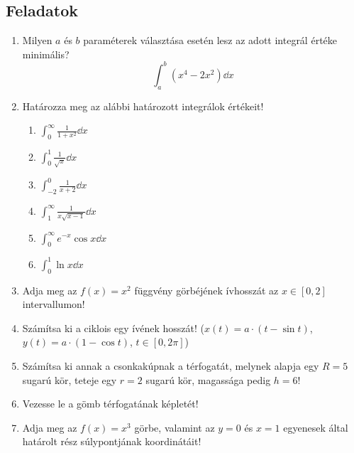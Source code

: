 \documentclass[a4paper, 12pt]{scrartcl}
\begin{document}
\clearpage
\subsection{Feladatok}

\begin{enumerate}
  \item Milyen $a$ és $b$ paraméterek választása esetén lesz az adott integrál
        értéke minimális?
        \[
          \int_a^b (x^4 - 2x^2) \dd x
        \]

  \item Határozza meg az alábbi határozott integrálok értékeit!
        \begin{multicols}{3}
          \begin{enumerate}
            \item $\displaystyle
                    \int_0^\infty \frac{1}{1 + x^2} \dd x
                  $

            \item $\displaystyle
                    \int_0^1 \frac{1}{\sqrt{x}} \dd x
                  $

            \item $\displaystyle
                    \int_{-2}^0 \frac{1}{x + 2} \dd x
                  $

            \item $\displaystyle
                    \int_1^\infty \frac{1}{x \sqrt{x - 1}} \dd x
                  $

            \item $\displaystyle
                    \int_0^\infty e^{-x} \cos x \dd x
                  $

            \item $\displaystyle
                    \int_0^1 \ln x \dd x
                  $
          \end{enumerate}
        \end{multicols}

  \item Adja meg az $f(x) = x^2$ függvény görbéjének ívhosszát az $x \in [0, 2]$
        intervallumon!

  \item Számítsa ki a ciklois egy ívének hosszát! ($x(t) = a \cdot (t - \sin t)$,
        $y(t) = a \cdot (1 - \cos t)$, $t \in [0, 2\pi]$)

  \item Számítsa ki annak a csonkakúpnak a térfogatát, melynek alapja egy
        $R = 5$ sugarú kör, teteje egy $r = 2$ sugarú kör, magassága pedig
        $h = 6$!

  \item Vezesse le a gömb térfogatának képletét!

  \item Adja meg az $f(x) = x^3$ görbe, valamint az $y = 0$ és $x = 1$
        egyenesek által határolt rész súlypontjának koordinátáit!
\end{enumerate}

\end{document}
